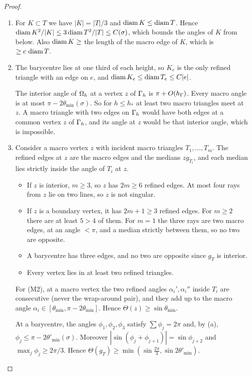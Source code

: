 \begin{proof}
\begin{enumerate}[label=(\alph*)]
\item For $K\subset T$ we have $|K|=|T|/3$ and $\operatorname{diam} K\le\operatorname{diam} T$. Hence $\operatorname{diam} K^2/|K|\le3\operatorname{diam} T^2/|T|\le C(\sigma)$, which bounds the angles of $K$ from below. Also $\operatorname{diam} K\ge$ the length of the macro edge of $K$, which is $\ge c\,\operatorname{diam} T$.
\item The barycentre lies at one third of each height, so $K_e$ is the only refined triangle with an edge on $e$, and $\operatorname{diam} K_e\le\operatorname{diam} T_e\le C|e|$.

The interior angle of $\Omega_h$ at a vertex $z$ of $\Gamma_h$ is $\pi+O(h_\Gamma)$. Every macro angle is at most $\pi-2\theta_{\min}(\sigma)$. So for $h\le h_\ast$ at least two macro triangles meet at $z$. A macro triangle with two edges on $\Gamma_h$ would have both edges at a common vertex $z$ of $\Gamma_h$, and its angle at $z$ would be that interior angle, which is impossible.
\item Consider a macro vertex $z$ with incident macro triangles $T_1,\dots,T_m$. The refined edges at $z$ are the macro edges and the medians $zg_{T_i}$, and each median lies strictly inside the angle of $T_i$ at $z$.
\begin{itemize}
\item If $z$ is interior, $m\ge3$, so $z$ has $2m\ge6$ refined edges. At most four rays from $z$ lie on two lines, so $z$ is not singular.
\item If $z$ is a boundary vertex, it has $2m+1\ge3$ refined edges. For $m\ge2$ there are at least $5>4$ of them. For $m=1$ the three rays are two macro edges, at an angle $<\pi$, and a median strictly between them, so no two are opposite.
\item A barycentre has three edges, and no two are opposite since $g_T$ is interior.
\item Every vertex lies in at least two refined triangles.
\end{itemize}
For (M2), at a macro vertex the two refined angles $\alpha_i',\alpha_i''$ inside $T_i$ are consecutive (never the wrap-around pair), and they add up to the macro angle $\alpha_i\in[\theta_{\min},\pi-2\theta_{\min}]$. Hence $\Theta(z)\ge\sin\theta_{\min}$.

At a barycentre, the angles $\phi_1,\phi_2,\phi_3$ satisfy $\sum\phi_j=2\pi$ and, by (a), $\phi_j\le\pi-2\theta'_{\min}(\sigma)$. Moreover $|\sin(\phi_j+\phi_{j+1})|=\sin\phi_{j+2}$ and $\max_j\phi_j\ge2\pi/3$. Hence $\Theta(g_T)\ge\min(\sin\tfrac{2\pi}3,\sin2\theta'_{\min})$.\qedhere
\end{enumerate}
\end{proof}

